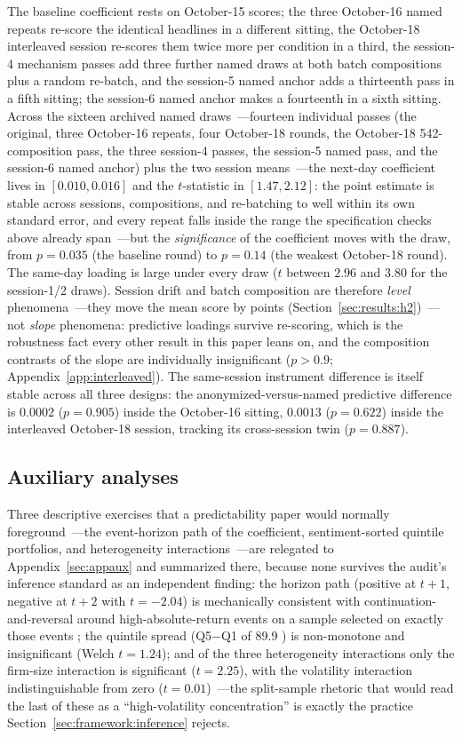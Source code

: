 The baseline coefficient rests on October-15 scores; the three October-16 named repeats re-score the identical headlines in a different sitting, the October-18 interleaved session re-scores them twice more per condition in a third, the session-4 mechanism passes add three further named draws at both batch compositions plus a random re-batch, and the session-5 named anchor adds a thirteenth pass in a fifth sitting; the session-6 named anchor makes a fourteenth in a sixth sitting. Across the sixteen archived named draws~---fourteen individual passes (the original, three October-16 repeats, four October-18 rounds, the October-18 542-composition pass, the three session-4 passes, the session-5 named pass, and the session-6 named anchor) plus the two session means~---the next-day coefficient lives in $[0.010, 0.016]$ and the $t$-statistic in $[1.47, 2.12]$: the point estimate is stable across sessions, compositions, and re-batching to well within its own standard error, and every repeat falls inside the range the specification checks above already span~---but the \emph{significance} of the coefficient moves with the draw, from $p=0.035$ (the baseline round) to $p=0.14$ (the weakest October-18 round). The same-day loading is large under every draw ($t$ between $2.96$ and $3.80$ for the session-1/2 draws). Session drift and batch composition are therefore \emph{level} phenomena~---they move the mean score by points (Section~\ref{sec:results:h2})~---not \emph{slope} phenomena: predictive loadings survive re-scoring, which is the robustness fact every other result in this paper leans on, and the composition contrasts of the slope are individually insignificant ($p>0.9$; Appendix~\ref{app:interleaved}). The same-session instrument difference is itself stable across all three designs: the anonymized-versus-named predictive difference is $0.0002$ ($p=0.905$) inside the October-16 sitting, $0.0013$ ($p=0.622$) inside the interleaved October-18 session, tracking its cross-session twin ($p=0.887$).

\subsection{Auxiliary analyses}
\label{sec:robust:aux}

Three descriptive exercises that a predictability paper would normally foreground~---the event-horizon path of the coefficient, sentiment-sorted quintile portfolios, and heterogeneity interactions~---are relegated to Appendix~\ref{sec:appaux} and summarized there, because none survives the audit's inference standard as an independent finding: the horizon path (positive at $t+1$, negative at $t+2$ with $t=-2.04$) is mechanically consistent with continuation-and-reversal around high-absolute-return events on a sample selected on exactly those events \citep{chan2003}; the quintile spread (Q5$-$Q1 of 89.9 \bps{}) is non-monotone and insignificant (Welch $t=1.24$); and of the three heterogeneity interactions only the firm-size interaction is significant ($t=2.25$), with the volatility interaction indistinguishable from zero ($t=0.01$)~---the split-sample rhetoric that would read the last of these as a ``high-volatility concentration'' is exactly the practice Section~\ref{sec:framework:inference} rejects.

